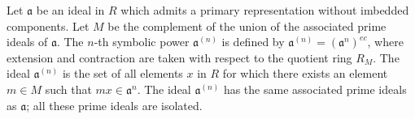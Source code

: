 Let $\mathfrak{a}$ be an ideal in $R$ which admits a primary representation without imbedded components. Let $M$ be the complement of the union of the associated prime ideals of $\mathfrak{a}$. The $n$-th symbolic power $\mathfrak{a}^{(n)}$ is defined by $\mathfrak{a}^{(n)} = (\mathfrak{a}^n)^{ec}$, where extension and contraction are taken with respect to the quotient ring $R_M$. The ideal $\mathfrak{a}^{(n)}$ is the set of all elements $x$ in $R$ for which there exists an element $m \in M$ such that $mx \in \mathfrak{a}^n$. The ideal $\mathfrak{a}^{(n)}$ has the same associated prime ideals as $\mathfrak{a}$; all these prime ideals are isolated.
